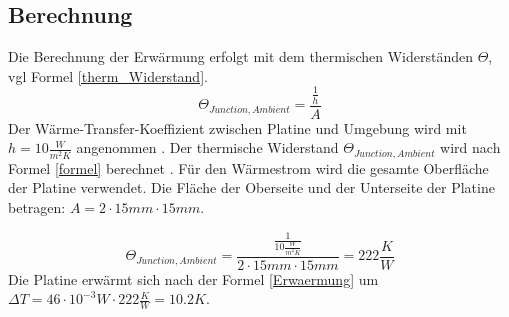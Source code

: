\documentclass[10pt,a4paper,oneside,abstracton]{scrartcl}
\begin{document}
\begin{multicols}{2}
\subsection{Berechnung }

\noindent
Die Berechnung der Erwärmung erfolgt mit dem thermischen Widerständen $\Theta$, vgl Formel \ref*{therm_Widerstand}.
\begin{equation}
	\Theta_{Junction, Ambient} = \frac{\frac{1}{h}}{A}
	\label{therm_Widerstand}
\end{equation}
Der Wärme-Transfer-Koeffizient zwischen Platine und Umgebung 
wird mit $ h = 10 \frac{W}{m^2K}$ angenommen \cite{TI_Thermal} .\newline
Der thermische Widerstand $\Theta_{Junction, Ambient}$  wird nach Formel \ref*{formel} berechnet . 
\newline
Für den Wärmestrom wird die gesamte Oberfläche der Platine verwendet. 
Die Fläche der Oberseite und der Unterseite der Platine betragen: \newline
$A = 2\cdot 15mm \cdot 15mm$. 

\begin{equation}
	\Theta_{Junction, Ambient} = \frac{\frac{1}{10 \frac{W}{m^2K}}}{ 2\cdot 15mm \cdot 15mm} = 222 \frac{K}{W}
	\label{formel}
\end{equation}
Die Platine erwärmt sich nach der Formel \ref{Erwaermung} um \newline
$\Delta T = 46 \cdot 10^{-3} W \cdot 222 \frac{K }{W} = 10.2 K  $.


\end{multicols}
\end{document}
